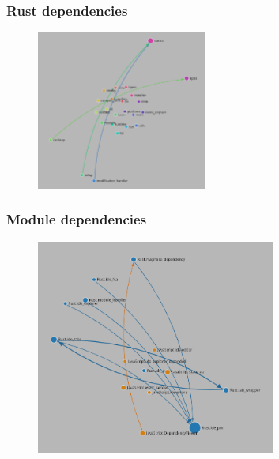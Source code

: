 \begin{frame}
  \frametitle{Rust dependencies}
  \begin{figure}
    \centering
    \includegraphics[width=0.5\textwidth]{./pics/rust-deps.png}
  \end{figure}
\end{frame}

\begin{frame}
  \frametitle{Module dependencies}
  \begin{figure}
    \centering
      \includegraphics[width=0.7\textwidth]{./pics/module-dependencies.png}
  \end{figure}
\end{frame}
